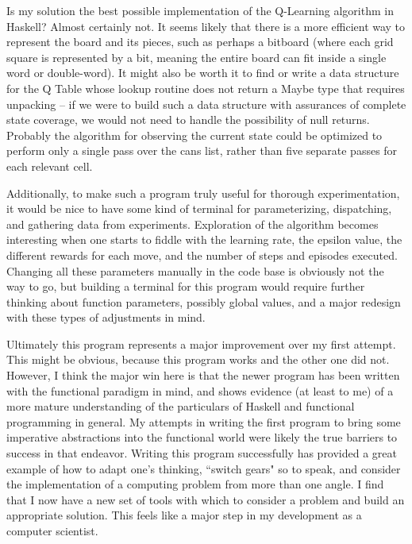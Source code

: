 \documentclass[12pt,a4paper]{article}
\begin{document}
		\par Is my solution the best possible implementation of the Q-Learning algorithm in Haskell? Almost certainly not. It seems likely that there is a more efficient way to represent the board and its pieces, such as perhaps a bitboard (where each grid square is represented by a bit, meaning the entire board can fit inside a single word or double-word). It might also be worth it to find or write a data structure for the Q Table whose lookup routine does not return a Maybe type that requires unpacking -- if we were to build such a data structure with assurances of complete state coverage, we would not need to handle the possibility of null returns. Probably the algorithm for observing the current state could be optimized to perform only a single pass over the cans list, rather than five separate passes for each relevant cell.
		\par Additionally, to make such a program truly useful for thorough experimentation, it would be nice to have some kind of terminal for parameterizing, dispatching, and gathering data from experiments. Exploration of the algorithm becomes interesting when one starts to fiddle with the learning rate, the epsilon value, the different rewards for each move, and the number of steps and episodes executed. Changing all these parameters manually in the code base is obviously not the way to go, but building a terminal for this program would require further thinking about function parameters, possibly global values, and a major redesign with these types of adjustments in mind. 
		\par Ultimately this program represents a major improvement over my first attempt. This might be obvious, because this program works and the other one did not. However, I think the major win here is that the newer program has been written with the functional paradigm in mind, and shows evidence (at least to me) of a more mature understanding of the particulars of Haskell and functional programming in general. My attempts in writing the first program to bring some imperative abstractions into the functional world were likely the true barriers to success in that endeavor. Writing this program successfully has provided a great example of how to adapt one's thinking, ``switch gears" so to speak, and consider the implementation of a computing problem from more than one angle. I find that I now have a new set of tools with which to consider a problem and build an appropriate solution. This feels like a major step in my development as a computer scientist.
\end{document}
